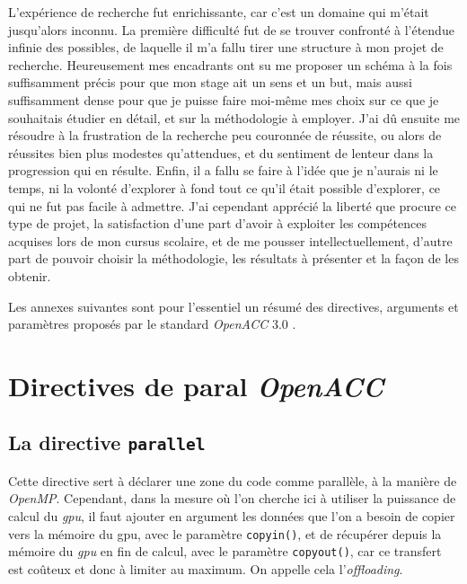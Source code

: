 \documentclass{article}
\begin{document}
L'expérience de recherche fut enrichissante, car c'est un domaine qui m'était jusqu'alors inconnu. La première difficulté fut de se trouver confronté à l'étendue infinie des possibles, de laquelle il m'a fallu tirer une structure à mon projet de recherche. Heureusement mes encadrants ont su me proposer un schéma à la fois suffisamment précis pour que mon stage ait un sens et un but, mais aussi suffisamment dense pour que je puisse faire moi-même mes choix sur ce que je souhaitais étudier en détail, et sur la méthodologie à employer. J'ai dû ensuite me résoudre à la frustration de la recherche peu couronnée de réussite, ou alors de réussites bien plus modestes qu'attendues, et du sentiment de lenteur dans la progression qui en résulte. Enfin, il a fallu se faire à l'idée que je n'aurais ni le temps, ni la volonté d'explorer à fond tout ce qu'il était possible d'explorer, ce qui ne fut pas facile à admettre. J'ai cependant apprécié la liberté que procure ce type de projet, la satisfaction d'une part d'avoir à exploiter les compétences acquises lors de mon cursus scolaire, et de me pousser intellectuellement, d'autre part de pouvoir choisir la méthodologie, les résultats à présenter et la façon de les obtenir.

\appendix

\newpage

Les annexes suivantes sont pour l'essentiel un résumé des directives, arguments et paramètres proposés par le standard \textit{OpenACC} 3.0 \cite{specs}.

\section{Directives de \gls{paral} \textit{OpenACC}}

\subsection{La directive \texttt{parallel}}

Cette directive sert à déclarer une zone du code comme parallèle, à la manière de \textit{OpenMP}. Cependant, dans la mesure où l'on cherche ici à utiliser la puissance de calcul du \textit{\gls{gpu}}, il faut ajouter en argument les données que l'on a besoin de copier vers la mémoire du \gls{gpu}, avec le paramètre \verb|copyin()|, et de récupérer depuis la mémoire du \textit{\gls{gpu}} en fin de calcul, avec le paramètre \verb|copyout()|, car ce transfert est coûteux et donc à limiter au maximum. On appelle cela l'\textit{offloading}.
\end{document}
